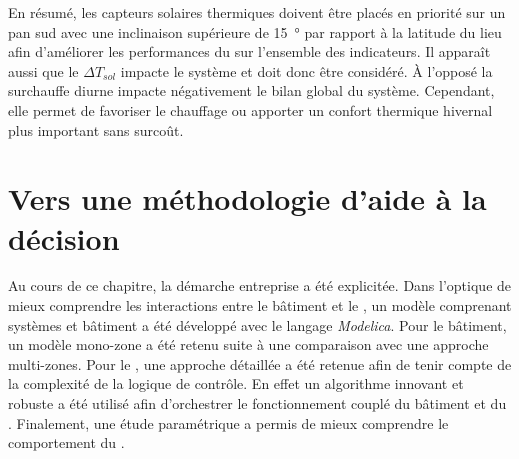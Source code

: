 En résumé, les capteurs solaires thermiques doivent être placés en priorité sur un pan sud
avec une inclinaison supérieure de \SI{15}{\degree} par rapport à la latitude du lieu afin
d’améliorer les performances du  sur l’ensemble des indicateurs. Il apparaît aussi
que le $\Delta T_{sol}$ impacte le système et doit donc être considéré. À l’opposé la surchauffe
diurne impacte négativement le bilan global du système. Cependant, elle permet de favoriser le
chauffage ou apporter un confort thermique hivernal plus important sans surcoût.


\clearpage


\section{Vers une méthodologie d’aide à la décision} %
\label{sec:vers_une_methodologie_d_aide_a_la_decision}
Au cours de ce chapitre, la démarche entreprise a été explicitée. Dans l’optique de mieux
comprendre les interactions entre le bâtiment et le , un modèle comprenant
systèmes et bâtiment a été développé avec le langage \textit{Modelica}. Pour le bâtiment, un
modèle mono-zone a été retenu suite à une comparaison avec une approche multi-zones.
Pour le , une approche détaillée a été retenue afin de tenir compte de la
complexité de la logique de contrôle. En effet un algorithme innovant et robuste a été
utilisé afin d’orchestrer le fonctionnement couplé du bâtiment et du .
Finalement, une étude paramétrique a permis de mieux comprendre le comportement du
.

